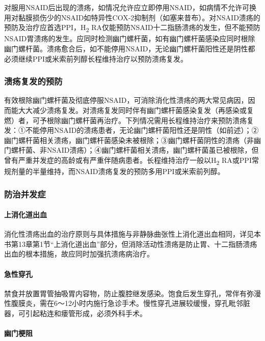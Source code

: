 对服用NSAID后出现的溃疡，如情况允许应立即停用NSAID，如病情不允许可换用对黏膜损伤少的NSAID如特异性COX-2抑制剂（如塞来昔布）。对NSAID溃疡的预防及治疗应首选PPI，H\textsubscript{2}
RA仅能预防NSAID十二指肠溃疡的发生，但不能预防NSAID胃溃疡的发生。应同时检测幽门螺杆菌，如有幽门螺杆菌感染应同时根除幽门螺杆菌。溃疡愈合后，如不能停用NSAID，无论幽门螺杆菌阳性还是阴性都必须继续PPI或米索前列醇长程维持治疗以预防溃疡复发。

\subsubsection{溃疡复发的预防}

有效根除幽门螺杆菌及彻底停服NSAID，可消除消化性溃疡的两大常见病因，因而能大大减少溃疡复发。对溃疡复发同时伴有幽门螺杆菌感染复发（再感染或复燃）者，可予根除幽门螺杆菌再治疗。下列情况需用长程维持治疗来预防溃疡复发：①不能停用NSAID的溃疡患者，无论幽门螺杆菌阳性还是阴性（如前述）；②幽门螺杆菌相关溃疡，幽门螺杆菌感染未被根除；③幽门螺杆菌阴性的溃疡（非幽门螺杆菌、非NSAID溃疡）；④幽门螺杆菌相关溃疡，幽门螺杆菌虽已被根除，但曾有严重并发症的高龄或有严重伴随病患者。长程维持治疗一般以H\textsubscript{2}
RA或PPI常规剂量的半量维持，而NSAID溃疡复发的预防多用PPI或米索前列醇。

\subsubsection{防治并发症}

\paragraph{上消化道出血}

消化性溃疡出血的治疗原则与具体措施与非静脉曲张性上消化道出血相同，详见本书第13章第1节“上消化道出血”部分，但消除活动性溃疡是防止胃、十二指肠溃疡出血的根本措施，故应同时加强抗溃疡病治疗。

\paragraph{急性穿孔}

禁食并放置胃管抽吸胃内容物，防止腹腔继发感染。饱食后发生穿孔，常伴有弥漫性腹膜炎，需在6～12小时内施行急诊手术。慢性穿孔进展较缓慢，穿孔毗邻脏器，可引起粘连和瘘管形成，必须外科手术。

\paragraph{幽门梗阻}

